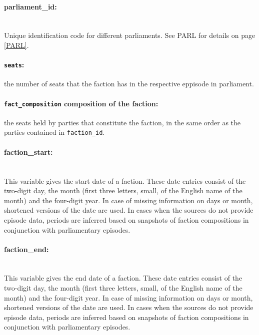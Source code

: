 \documentclass{article}
\begin{document}
\paragraph{parliament\_id:}\\
Unique identification code for different parliaments. See PARL for details on page \ref{PARL}.

\paragraph{\texttt{seats}:} the number of seats that the faction has in the respective eppisode in parliament.\\ 

\paragraph{\texttt{fact\_composition} composition of the faction:} the seats held by parties that constitute the faction, in the same order as the parties contained in \texttt{faction\_id}.\\

\paragraph{faction\_start:}\\
    This variable gives the start date of a faction. These date entries consist of the two-digit day, the month (first three letters, small, of the English name of the month) and the four-digit year. In case of missing information on days or month, shortened versions of the date are used. In cases when the sources do not provide episode data, periods are inferred based on snapshots of faction compositions in conjunction with parliamentary episodes.
    
\paragraph{faction\_end:}\\
    This variable gives the end date of a faction. These date entries consist of the two-digit day, the month (first three letters, small, of the English name of the month) and the four-digit year. In case of missing information on days or month, shortened versions of the date are used. In cases when the sources do not provide episode data, periods are inferred based on snapshots of faction compositions in conjunction with parliamentary episodes.
\end{document}
